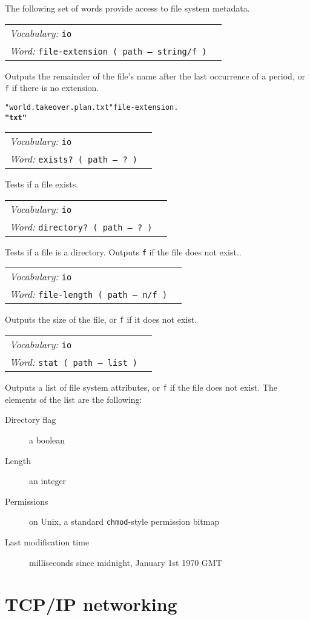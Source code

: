 \documentclass{book}
\newcommand{\vocabulary}[1]{\emph{Vocabulary:} \texttt{#1}&\\}
\newcommand{\ordinaryword}[2]{\index{\texttt{#1}}\emph{Word:} \texttt{#2}&\\}
\newcommand{\wordtable}[1]{


\begin{tabularx}{12cm}{lX}
\hline
#1
\hline
\end{tabularx}

}
\begin{document}
The following set of words provide access to file system metadata.

\wordtable{
\vocabulary{io}
\ordinaryword{file-extension}{file-extension~( path -- string/f )}

}
Outputs the remainder of the file's name after the last occurrence of a period, or \texttt{f} if there is no extension.
\begin{alltt}
  "world.takeover.plan.txt" file-extension .
\textbf{"txt"}
\end{alltt}
\wordtable{
\vocabulary{io}
\ordinaryword{exists?}{exists?~( path -- ?~)}

}
Tests if a file exists.
\wordtable{
\vocabulary{io}
\ordinaryword{directory?}{directory?~( path -- ?~)}

}
Tests if a file is a directory. Outputs \texttt{f} if the file does not exist..
\wordtable{
\vocabulary{io}
\ordinaryword{file-length}{file-length~( path -- n/f~)}

}
Outputs the size of the file, or \texttt{f} if it does not exist.
\wordtable{
\vocabulary{io}
\ordinaryword{stat}{stat~( path -- list~)}

}
Outputs a list of file system attributes, or \texttt{f} if the file does not exist. The elements of the list are the following:
\begin{description}
\item[Directory flag] a boolean
\item[Length] an integer
\item[Permissions] on Unix, a standard \texttt{chmod}-style permission bitmap
\item[Last modification time] milliseconds since midnight, January 1st 1970 GMT
\end{description}

\section{TCP/IP networking}
\end{document}

